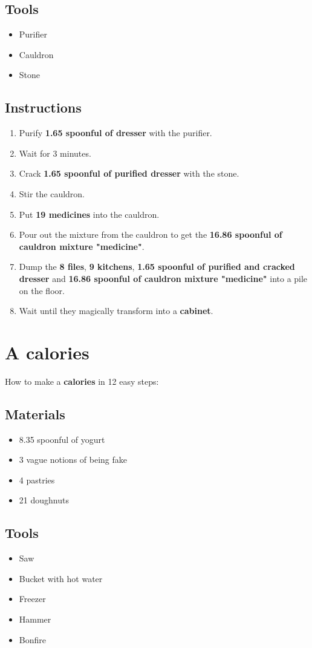 \documentclass{article}
\begin{document}
\subsection{Tools}\begin{itemize}
\item 
Purifier
\item 
Cauldron
\item 
Stone
\end{itemize}
\subsection{Instructions}\begin{enumerate}
\item 
Purify \textbf{1.65 spoonful of dresser} with the purifier.
\item 
Wait for 3 minutes.
\item 
Crack \textbf{1.65 spoonful of purified dresser} with the stone.
\item 
Stir the cauldron.
\item 
Put \textbf{19 medicines} into the cauldron.
\item 
Pour out the mixture from the cauldron to get the \textbf{16.86 spoonful of cauldron mixture "medicine"}.
\item 
Dump the \textbf{8 files}, \textbf{9 kitchens}, \textbf{1.65 spoonful of purified and cracked dresser} and \textbf{16.86 spoonful of cauldron mixture "medicine"} into a pile on the floor.
\item 
Wait until they magically transform into a \textbf{cabinet}.
\end{enumerate}
\newpage
\section{A calories}How to make a \textbf{calories} in 12 easy steps:

\subsection{Materials}\begin{itemize}
\item 
8.35 spoonful of yogurt
\item 
3 vague notions of being fake
\item 
4 pastries
\item 
21 doughnuts
\end{itemize}
\subsection{Tools}\begin{itemize}
\item 
Saw
\item 
Bucket with hot water
\item 
Freezer
\item 
Hammer
\item 
Bonfire
\end{itemize}
\end{document}
